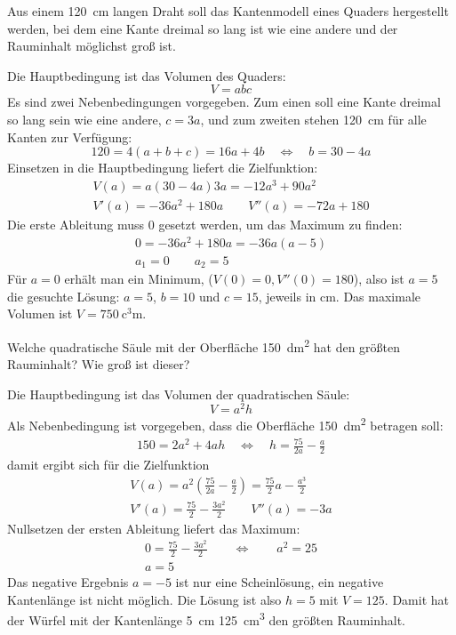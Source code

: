 \documentclass[auto-toc=false,babel=ngerman]{arbeitsblatt}
\begin{document}
\begin{question}
  Aus einem \SI{120}{\centi\metre} langen Draht soll das Kantenmodell eines
  Quaders hergestellt werden, bei dem eine Kante dreimal so lang ist wie eine
  andere und der Rauminhalt möglichst groß ist.
\end{question}
\begin{solution}
  Die Hauptbedingung ist das Volumen des Quaders:
  \[ V = abc \]
  Es sind zwei Nebenbedingungen vorgegeben.  Zum einen soll eine Kante dreimal
  so lang sein wie eine andere, $c = 3a$, und zum zweiten stehen
  \SI{120}{\centi\metre} für alle Kanten zur Verfügung:
  \[
    120 = 4(a+b+c) = 16a + 4b \quad\Leftrightarrow\quad
    b = 30-4a
  \]
  Einsetzen in die Hauptbedingung liefert die Zielfunktion:
  \begin{gather*}
    V(a)   = a(30-4a)3a = -12a^3 +90a^2 \\
    V'(a)  = -36a^2+180a \qquad 
    V''(a) = -72a+180
  \end{gather*}
  Die erste Ableitung muss $0$ gesetzt werden, um das Maximum zu finden:
  \begin{gather*}
    0 = -36a^2+180a = -36a(a-5) \\
    a_1 = 0 \qquad a_2 = 5
  \end{gather*}
  Für $a=0$ erhält man ein Minimum, ($V(0)=0, V''(0)=180$), also ist $a=5$ die
  gesuchte Lösung: $a = 5$, $b = 10$ und $c = 15$, jeweils in
  \si{\centi\metre}.  Das maximale Volumen ist  $V =
  \SI{750}{\cubic\centi\metre}$.
\end{solution}

\begin{question}
  Welche quadratische Säule mit der Oberfläche \SI{150}{\deci\metre\squared}
  hat den größten Rauminhalt?  Wie groß ist dieser?
\end{question}
\begin{solution}
  Die Hauptbedingung ist das Volumen der quadratischen Säule:
  \[ V = a^2h \]
  Als Nebenbedingung ist vorgegeben, dass die Oberfläche
  \SI{150}{\deci\metre\squared} betragen soll:
  \begin{gather*}
    150 = 2a^2 + 4ah \quad\Leftrightarrow\quad
    h = \frac{75}{2a} - \frac{a}{2}
  \end{gather*}
  damit ergibt sich für die Zielfunktion
  \begin{gather*}
    V(a)   = a^2\left(\frac{75}{2a} - \frac{a}{2}\right)
           = \frac{75}{2}a - \frac{a^3}{2} \\
    V'(a)  = \frac{75}{2} - \frac{3a^2}{2} \qquad
    V''(a) = -3a
  \end{gather*}
  Nullsetzen der ersten Ableitung liefert das Maximum:
  \begin{gather*}
    0 = \frac{75}{2} - \frac{3a^2}{2} \qquad\Leftrightarrow\qquad
    a^2 = 25 \\
    a = 5
  \end{gather*}
  Das negative Ergebnis $a=-5$ ist nur eine Scheinlösung, ein negative
  Kantenlänge ist nicht möglich.  Die Lösung ist also $h = 5$ mit $V = 125$.
  Damit hat der Würfel mit der Kantenlänge \SI{5}{\centi\metre}
  \SI{125}{\centi\metre\cubed} den größten Rauminhalt.
\end{solution}
\end{document}
